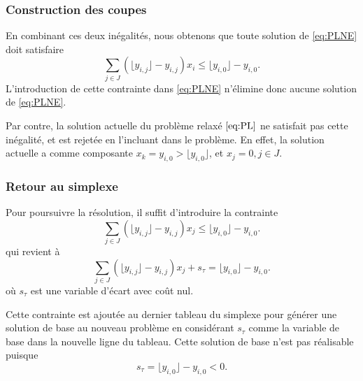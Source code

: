 \documentclass[usepdftitle=false]{beamer}
\begin{document}
\begin{frame}
\frametitle{Construction des coupes}


En combinant ces deux inégalités, nous obtenons que toute solution de \eqref{eq:PLNE} doit satisfaire
$$
\sum_{j \in J} \left( \lfloor y_{i,j} \rfloor - y_{i,j} \right) x_i \leq \lfloor y_{i,0} \rfloor - y_{i,0}.
$$
L'introduction de cette contrainte dans \eqref{eq:PLNE} n'élimine donc aucune solution de \eqref{eq:PLNE}.

\mbox{}

Par contre, la solution actuelle du problème relaxé $\eqref{eq:PL}$ ne satisfait pas cette inégalité, et est rejetée en l'incluant dans le problème. En effet, la solution actuelle a comme composante $x_k = y_{i,0} > \lfloor y_{i,0} \rfloor$, et $x_j = 0, j \in J$.

\end{frame}

\begin{frame}
\frametitle{Retour au simplexe}

Pour poursuivre la résolution, il suffit d'introduire la contrainte
$$
\sum_{j \in J} \left( \lfloor y_{i,j} \rfloor - y_{i,j} \right) x_j \leq \lfloor y_{i,0} \rfloor - y_{i,0}.
$$
qui revient à
$$
\sum_{j \in J} \left( \lfloor y_{i,j} \rfloor - y_{i,j} \right) x_j + s_{\tau} = \lfloor y_{i,0} \rfloor - y_{i,0}.
$$
où $s_{\tau}$ est une variable d'écart avec coût nul.

\mbox{}

Cette contrainte est ajoutée au dernier tableau du simplexe pour générer une solution de base au nouveau problème en considérant $s_{\tau}$ comme la variable de base dans la nouvelle ligne du tableau.
Cette solution de base n'est pas réalisable puisque
$$
s_{\tau} = \lfloor y_{i,0} \rfloor - y_{i,0} < 0.
$$

\end{frame}
\end{document}
